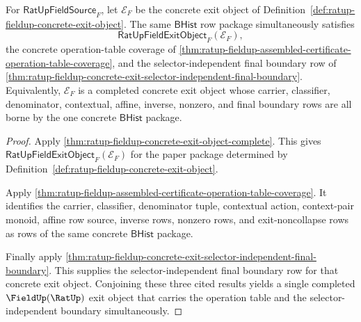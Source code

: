 \begin{theorem}
\label{thm:ratup-fieldup-exit-object-operation-table-lock}
For $\mathsf{RatUpFieldSource}_F$, let $\mathcal E_F$ be the concrete exit
object of Definition~\ref{def:ratup-fieldup-concrete-exit-object}. The same
$\mathsf{BHist}$ row package simultaneously satisfies
$$
\mathsf{RatUpFieldExitObject}_F(\mathcal E_F),
$$
the concrete operation-table coverage of
\autoref{thm:ratup-fieldup-assembled-certificate-operation-table-coverage}, and
the selector-independent final boundary row of
\autoref{thm:ratup-fieldup-concrete-exit-selector-independent-final-boundary}.
Equivalently, $\mathcal E_F$ is a completed concrete exit object whose carrier,
classifier, denominator, contextual, affine, inverse, nonzero, and final
boundary rows are all borne by the one concrete $\mathsf{BHist}$ package.
\end{theorem}
\begin{proof}
Apply \autoref{thm:ratup-fieldup-concrete-exit-object-complete}. This gives
$\mathsf{RatUpFieldExitObject}_F(\mathcal E_F)$ for the paper package
determined by Definition~\ref{def:ratup-fieldup-concrete-exit-object}.

Apply
\autoref{thm:ratup-fieldup-assembled-certificate-operation-table-coverage}. It
identifies the carrier, classifier, denominator tuple, contextual action,
context-pair monoid, affine row source, inverse rows, nonzero rows, and
exit-noncollapse rows as rows of the same concrete $\mathsf{BHist}$ package.

Finally apply
\autoref{thm:ratup-fieldup-concrete-exit-selector-independent-final-boundary}.
This supplies the selector-independent final boundary row for that concrete
exit object. Conjoining these three cited results yields a single completed
$\FieldUp(\RatUp)$ exit object that carries the operation table and the
selector-independent boundary simultaneously.
\end{proof}

